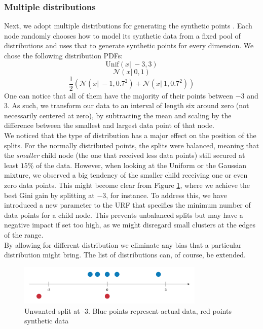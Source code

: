 \documentclass[conference]{IEEEtran}
\begin{document}
\subsubsection{Multiple distributions}
Next, we adopt multiple distributions for generating the synthetic points \cite{Kruber2019UnsupervisedAS}. Each node randomly chooses how to model its synthetic data from a fixed pool of distributions and uses that to generate synthetic points for every dimension. We chose the following distribution PDFs:
\begin{equation}
 \textrm{Unif}(x|\ -3,3)
 \end{equation}
 \begin{equation}
 \mathcal{N}(x|\ 0,1)
\end{equation}
\begin{equation}
\frac{1}{2}(\mathcal{N}(x|\ -1,0.7^2) + \mathcal{N}(x|\ 1,0.7^2))
\end{equation}
One can notice that all of them have the majority of their points between $-3$ and $3$. As such, we transform our data to an interval of length six around zero (not necessarily centered at zero), by subtracting the mean and scaling by the difference between the smallest and largest data point of that node.\\
We noticed that the type of distribution has a major effect on the position of the splits. For the normally distributed points, the splits were balanced, meaning that the \emph{smaller} child node (the one that received less data points) still secured at least $15\%$ of the data. However, when looking at the Uniform or the Gaussian mixture, we observed a big tendency of the smaller child receiving one or even zero data points. This might become clear from Figure \ref{zero}, where we achieve the best Gini gain by splitting at $-3$, for instance. To address this, we have introduced a new parameter to the URF that specifies the minimum number of data points for a child node. This prevents unbalanced splits but may have a negative impact if set too high, as we might disregard small clusters at the edges of the range.\\
By allowing for different distribution we eliminate any bias that a particular distribution might bring. The list of distributions can, of course, be extended.


\begin{figure}[!h]
  \centering
  \includegraphics[width=3.5in]{./images/cut_off}
  \caption{Unwanted split at -3. Blue points represent actual data, red points synthetic data}
  \label{zero}
\end{figure}
\end{document}

